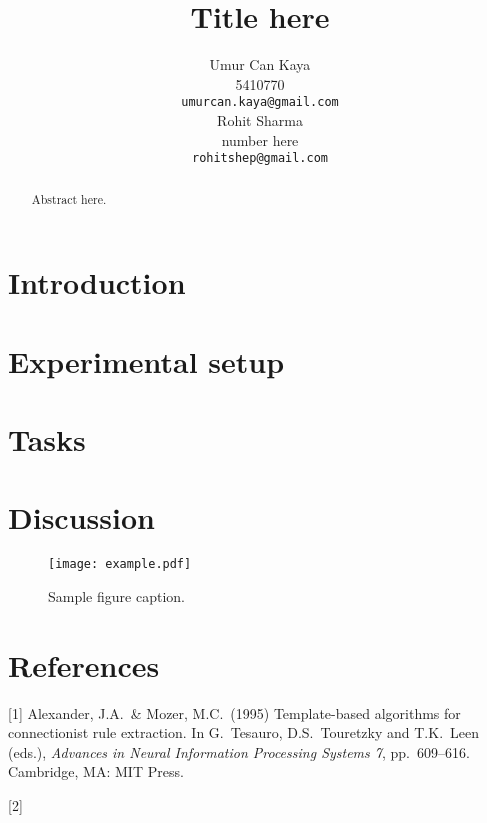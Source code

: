 \documentclass{article}
\title{Title here}
\author{
Umur Can Kaya\\
5410770\\
\texttt{umurcan.kaya@gmail.com}\\
\And
Rohit Sharma\\
number here\\
\texttt{rohitshep@gmail.com}\\
}
\begin{document}
\maketitle

\begin{abstract}

Abstract here.
\end{abstract}

\section{Introduction}


\section{Experimental setup}
\section{Tasks}
\section{Discussion}

\begin{figure}[h!]
\centering
\texttt{[image: example.pdf]}
\caption{Sample figure caption.}
\end{figure}


\section*{References}

[1] Alexander, J.A.\ \& Mozer, M.C.\ (1995) Template-based algorithms for
connectionist rule extraction. In G.\ Tesauro, D.S.\ Touretzky and T.K.\ Leen
(eds.), {\it Advances in Neural Information Processing Systems 7},
pp.\ 609--616. Cambridge, MA: MIT Press.

[2]
\end{document}
